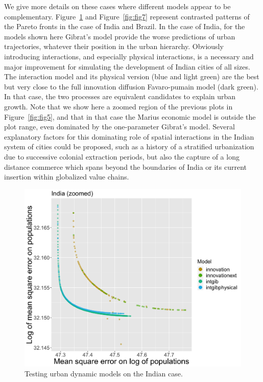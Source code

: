 \documentclass[11pt]{article}
\begin{document}
We give more details on these cases where different models appear to be complementary. Figure~\ref{fig:fig6} and Figure~\ref{fig:fig7} represent contrasted patterns of the Pareto fronts in the case of India and Brazil. In the case of India, for the models shown here Gibrat's model provide the worse predictions of urban trajectories, whatever their position in the urban hierarchy. Obviously introducing interactions, and especially physical interactions, is a necessary and major improvement for simulating the development of Indian cities of all sizes. The interaction model and its physical version (blue and light green) are the best but very close to the full innovation diffusion Favaro-pumain model (dark green). In that case, the two processes are equivalent candidates to explain urban growth. Note that we show here a zoomed region of the previous plots in Figure~\ref{fig:fig5}, and that in that case the Marius economic model is outside the plot range, even dominated by the one-parameter Gibrat’s model. Several explanatory factors for this dominating role of spatial interactions in the Indian system of cities could be proposed, such as a history of a stratified urbanization due to successive colonial extraction periods, but also the capture of a long distance commerce which spans beyond the boundaries of India or its current insertion within globalized value chains.


\begin{figure}
\centering
\includegraphics[width=\textwidth]{Fig6.png}
\caption{Testing urban dynamic models on the Indian case.\label{fig:fig6}}
\end{figure}   
\end{document}
